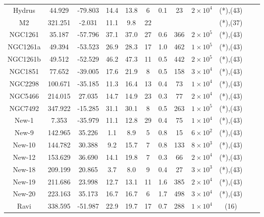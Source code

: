 \begin{table}
\begin{tabular}{cSSSScSccccc}
Hydrus & 44.929 & -79.803 & 14.4 & 13.8 & 6 & 0.1 & 23 & $2 \times 10^{4}$ & (*),(43) \\
M2 & 321.251 & -2.031 & 11.1 & 9.8 & 22 & & & & (*),(37) \\
NGC1261 & 35.187 & -57.796 & 37.1 & 37.0 & 27 & 0.6 & 366 & $2 \times 10^{5}$ & (*),(43) \\
NGC1261a & 49.394 & -53.523 & 26.9 & 28.3 & 17 & 1.0 & 462 & $1 \times 10^{5}$ & (*),(43) \\
NGC1261b & 49.512 & -52.529 & 46.2 & 47.3 & 11 & 0.5 & 442 & $2 \times 10^{5}$ & (*),(43) \\
NGC1851 & 77.652 & -39.005 & 17.6 & 21.9 & 8 & 0.5 & 158 & $3 \times 10^{4}$ & (*),(43) \\
NGC2298 & 100.671 & -35.185 & 11.3 & 16.4 & 13 & 0.4 & 73 & $1 \times 10^{4}$ & (*),(43) \\
NGC5466 & 214.015 & 27.035 & 14.7 & 14.9 & 23 & 0.3 & 77 & $2 \times 10^{4}$ & (*),(43) \\
NGC7492 & 347.922 & -15.285 & 31.1 & 30.1 & 8 & 0.5 & 263 & $1 \times 10^{5}$ & (*),(43) \\
New-1 & 7.353 & -35.979 & 11.1 & 12.8 & 29 & 0.4 & 75 & $1 \times 10^{4}$ & (*),(43) \\
New-9 & 142.965 & 35.226 & 1.1 & 8.9 & 5 & 0.8 & 15 & $6 \times 10^{2}$ & (*),(43) \\
New-10 & 144.782 & 30.388 & 9.2 & 15.7 & 7 & 0.8 & 133 & $8 \times 10^{3}$ & (*),(43) \\
New-12 & 153.629 & 36.690 & 14.1 & 19.8 & 7 & 0.3 & 66 & $2 \times 10^{4}$ & (*),(43) \\
New-18 & 209.199 & 20.865 & 3.7 & 8.0 & 9 & 0.4 & 27 & $3 \times 10^{3}$ & (*),(43) \\
New-19 & 211.686 & 23.998 & 12.7 & 13.1 & 11 & 1.6 & 385 & $2 \times 10^{4}$ & (*),(43) \\
New-20 & 223.163 & 35.173 & 16.7 & 16.7 & 6 & 1.7 & 498 & $3 \times 10^{4}$ & (*),(43) \\
Ravi & 338.595 & -51.987 & 22.9 & 19.7 & 17 & 0.7 & 288 & $1 \times 10^{4}$ & (16) \\
\hline \hline
\end{tabular}
\end{table}
